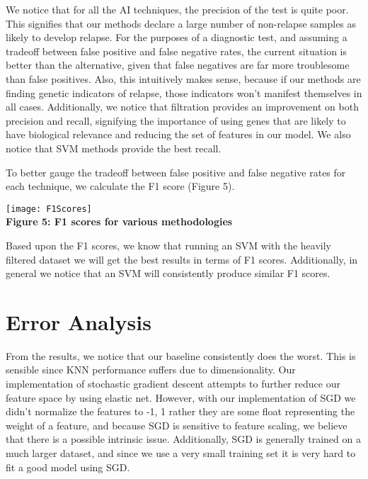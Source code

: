 \documentclass[12pt]{scrartcl}
\begin{document}
    We notice that for all the AI techniques, the precision of the test is quite poor. This signifies that our methods declare a large number of non-relapse samples as likely to develop relapse. For the purposes of a diagnostic test, and assuming a tradeoff between false positive and false negative rates, the current situation is better than the alternative, given that false negatives are far more troublesome than false positives. Also, this intuitively makes sense, because if our methods are finding genetic indicators of relapse, those indicators won't manifest themselves in all cases. Additionally, we notice that filtration provides an improvement on both precision and recall, signifying the importance of using genes that are likely to have biological relevance and reducing the set of features in our model. We also notice that SVM methods provide the best recall.
    
    To better gauge the tradeoff between false positive and false negative rates for each technique, we calculate the F1 score (Figure 5).
    
    \begin{center}
    \texttt{[image: F1Scores]}\\
    \textbf{Figure 5: F1 scores for various methodologies}
    \end{center}

    Based upon the F1 scores, we know that running an SVM with the heavily filtered dataset we will get the best results in terms of F1 scores. Additionally, in general we notice that an SVM will consistently produce similar F1 scores. 


    \section{Error Analysis}
    From the results, we notice that our baseline consistently does the worst. This is sensible since KNN performance suffers due to dimensionality. Our implementation of stochastic gradient descent attempts to further reduce our feature space by using elastic net. However, with our implementation of SGD we didn't normalize the features to -1, 1 rather they are some float representing the weight of a feature, and because SGD is sensitive to feature scaling, we believe that there is a possible intrinsic issue. Additionally, SGD is generally trained on a much larger dataset, and since we use a very small training set it is very hard to fit a good model using SGD. \\
\end{document}
